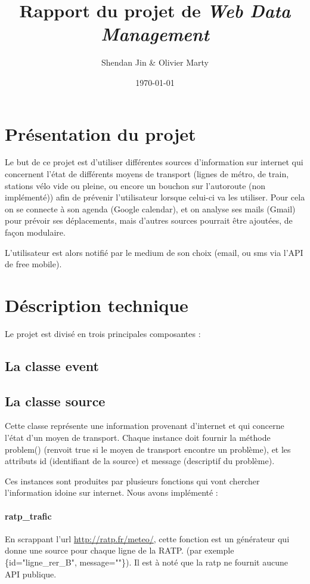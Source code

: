 \documentclass[a4paper, 12pt]{article}
\title{Rapport du projet de \emph{Web Data Management}}
\author{Shendan Jin \& Olivier Marty}
\date\today
\begin{document}
\maketitle

\section{Présentation du projet}

Le but de ce projet est d'utiliser différentes sources d'information sur
internet qui concernent l'état de différents moyens de transport (lignes de
métro, de train, stations vélo vide ou pleine, ou encore un bouchon sur
l'autoroute (non implémenté)) afin de prévenir l'utilisateur lorsque celui-ci va
les utiliser.
Pour cela on se connecte à son agenda (Google calendar), et on analyse ses mails
(Gmail) pour prévoir ses déplacements, mais d'autres sources pourrait être
ajoutées, de façon modulaire.

L'utilisateur est alors notifié par le medium de son choix (email, ou sms via
l'API de free mobile).

\section{Déscription technique}

Le projet est divisé en trois principales composantes :

\subsection{La classe event}

\subsection{La classe source} Cette classe représente une information provenant
d'internet et qui concerne l'état d'un moyen de transport.
Chaque instance doit fournir la méthode problem() (renvoit true si le moyen de
transport encontre un problème), et les attributs id (identifiant de la source)
et message (descriptif du problème).

Ces instances sont produites par plusieurs fonctions qui vont chercher
l'information idoine sur internet. Nous avons implémenté :

\paragraph{ratp\_trafic} En scrappant l'url \url{http://ratp.fr/meteo/}, cette
fonction est un générateur qui donne une source pour chaque ligne de la RATP.
(par exemple \{id="ligne\_rer\_B", message=""\}). %
Il est à noté que la ratp ne fournit aucune API publique.
\end{document}

